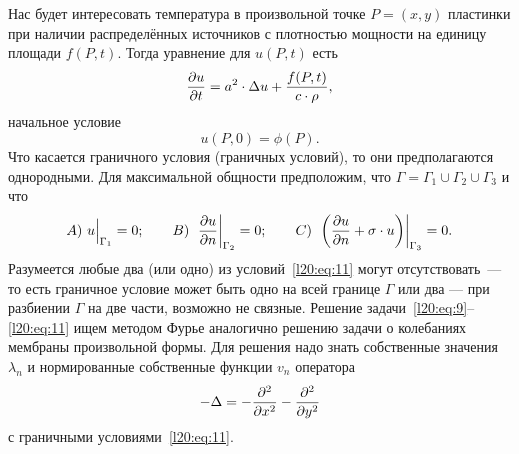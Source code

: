 \noindent Нас будет интересовать температура в произвольной точке $P=(x,y)$ пластинки при наличии распределённых источников с плотностью мощности на единицу площади $f(P,t)$. Тогда уравнение для $u(P,t)$ есть 
\begin{equation}\label{l20:eq:9}
	\frac{\partial u}{\partial t}=a^2\cdot\Delta u+\frac{f(P,t)}{c\cdot\rho},
\end{equation}
начальное условие
\begin{equation}\label{l20:eq:10}
	u(P,0)=\phi(P).
\end{equation}
Что касается граничного условия (граничных условий), то они предполагаются однородными. Для максимальной общности предположим, что $\Gamma=\Gamma_{1}\cup\Gamma_{2}\cup\Gamma_{3}$ и что
\begin{equation}\label{l20:eq:11}
	A)\ u\Big|_{\Gamma_{1}}=0;\qquad B)\ \left.\pder{u}{n}\right|_{\Gamma_{2}}=0;\qquad C)\ \left.\left(\pder{u}{n}+\sigma\cdot u\right)\right|_{\Gamma_{3}}=0.
\end{equation}
Разумеется любые два (или одно) из условий~\eqref{l20:eq:11} могут отсутствовать~--- то есть граничное условие может быть одно на всей границе $\Gamma$ или два --- при разбиении $\Gamma$ на две части, возможно не связные. Решение задачи~\eqref{l20:eq:9}--\eqref{l20:eq:11} ищем методом Фурье аналогично решению задачи о колебаниях мембраны произвольной формы. Для решения надо знать собственные значения $\lambda_n$ и нормированные собственные функции $v_n$ оператора 
\begin{equation*}
	-\Delta=-\frac{\partial^2}{\partial x^2}-\frac{\partial^2}{\partial y^2} 
\end{equation*}
с граничными условиями~\eqref{l20:eq:11}. 

